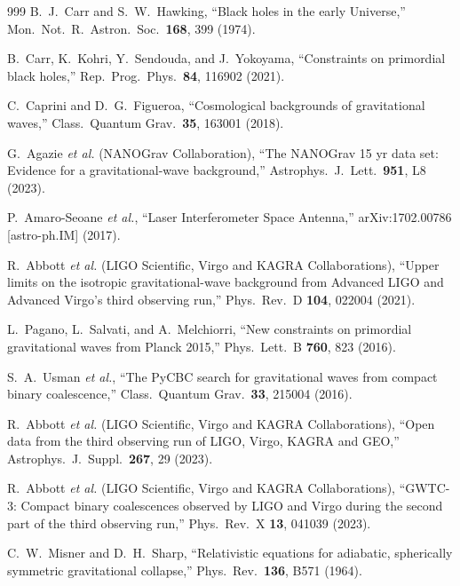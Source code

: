 \documentclass[twocolumn,floatfix,aps,prd,superscriptaddress,nofootinbib,showkeys]{revtex4-2}
\begin{document}
\begin{thebibliography}{999}
B.~J.~Carr and S.~W.~Hawking,
\newblock ``Black holes in the early Universe,''
\newblock Mon.\ Not.\ R.\ Astron.\ Soc.\ \textbf{168}, 399 (1974).

B.~Carr, K.~Kohri, Y.~Sendouda, and J.~Yokoyama,
\newblock ``Constraints on primordial black holes,''
\newblock Rep.\ Prog.\ Phys.\ \textbf{84}, 116902 (2021).

C.~Caprini and D.~G.~Figueroa,
\newblock ``Cosmological backgrounds of gravitational waves,''
\newblock Class.\ Quantum Grav.\ \textbf{35}, 163001 (2018).

G.~Agazie \emph{et al.} (NANOGrav Collaboration),
\newblock ``The NANOGrav 15 yr data set: Evidence for a gravitational-wave background,''
\newblock Astrophys.\ J.\ Lett.\ \textbf{951}, L8 (2023).

P.~Amaro-Seoane \emph{et al.},
\newblock ``Laser Interferometer Space Antenna,''
\newblock arXiv:1702.00786 [astro-ph.IM] (2017).

R.~Abbott \emph{et al.} (LIGO Scientific, Virgo and KAGRA Collaborations),
\newblock ``Upper limits on the isotropic gravitational-wave background from Advanced LIGO and Advanced Virgo's third observing run,''
\newblock Phys.\ Rev.\ D \textbf{104}, 022004 (2021).

L.~Pagano, L.~Salvati, and A.~Melchiorri,
\newblock ``New constraints on primordial gravitational waves from Planck 2015,''
\newblock Phys.\ Lett.\ B \textbf{760}, 823 (2016).

S.~A.~Usman \emph{et al.},
\newblock ``The PyCBC search for gravitational waves from compact binary coalescence,''
\newblock Class.\ Quantum Grav.\ \textbf{33}, 215004 (2016).

R.~Abbott \emph{et al.} (LIGO Scientific, Virgo and KAGRA Collaborations),
\newblock ``Open data from the third observing run of LIGO, Virgo, KAGRA and GEO,''
\newblock Astrophys.\ J.\ Suppl.\ \textbf{267}, 29 (2023).

R.~Abbott \emph{et al.} (LIGO Scientific, Virgo and KAGRA Collaborations),
\newblock ``GWTC-3: Compact binary coalescences observed by LIGO and Virgo during the second part of the third observing run,''
\newblock Phys.\ Rev.\ X \textbf{13}, 041039 (2023).

C.~W.~Misner and D.~H.~Sharp,
\newblock ``Relativistic equations for adiabatic, spherically symmetric gravitational collapse,''
\newblock Phys.\ Rev.\ \textbf{136}, B571 (1964).


\end{thebibliography}
\end{document}
